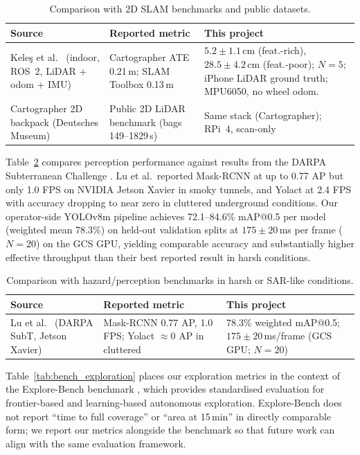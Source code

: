 \begin{table}[htbp]
\caption{Comparison with 2D SLAM benchmarks and public datasets.}
\label{tab:bench_slam}
\centering
\begin{tabular}{p{2.8cm}p{3.2cm}p{3.5cm}}
\toprule
\textbf{Source} & \textbf{Reported metric} & \textbf{This project} \\
\midrule
Kele{\c s} et al.\ \cite{keles2025} (indoor, ROS~2, LiDAR + odom + IMU) & Cartographer ATE 0.21\,m; SLAM Toolbox 0.13\,m & $5.2 \pm 1.1$\,cm (feat.-rich), $28.5 \pm 4.2$\,cm (feat.-poor); $N{=}5$; iPhone LiDAR ground truth; MPU6050, no wheel odom. \\
Cartographer 2D backpack \cite{cartographerdata} (Deutsches Museum) & Public 2D LiDAR benchmark (bags 149--1829\,s) & Same stack (Cartographer); RPi~4, scan-only \\
\bottomrule
\end{tabular}
\end{table}

Table~\ref{tab:bench_perception} compares perception performance against results from the DARPA Subterranean Challenge \cite{lu2022}. Lu et al.\ reported Mask-RCNN at up to 0.77 AP but only 1.0 FPS on NVIDIA Jetson Xavier in smoky tunnels, and Yolact at 2.4 FPS with accuracy dropping to near zero in cluttered underground conditions. Our operator-side YOLOv8m pipeline achieves 72.1--84.6\% mAP@0.5 per model (weighted mean 78.3\%) on held-out validation splits at $175 \pm 20$\,ms per frame ($N{=}20$) on the GCS GPU, yielding comparable accuracy and substantially higher effective throughput than their best reported result in harsh conditions.

\begin{table}[htbp]
\caption{Comparison with hazard/perception benchmarks in harsh or SAR-like conditions.}
\label{tab:bench_perception}
\centering
\begin{tabular}{p{2.8cm}p{3.2cm}p{3.5cm}}
\toprule
\textbf{Source} & \textbf{Reported metric} & \textbf{This project} \\
\midrule
Lu et al.\ \cite{lu2022} (DARPA SubT, Jetson Xavier) & Mask-RCNN 0.77 AP, 1.0 FPS; Yolact $\approx$0 AP in cluttered & 78.3\% weighted mAP@0.5; $175 \pm 20$\,ms/frame (GCS GPU; $N{=}20$) \\
\bottomrule
\end{tabular}
\end{table}

Table~\ref{tab:bench_exploration} places our exploration metrics in the context of the Explore-Bench benchmark \cite{xu2022}, which provides standardised evaluation for frontier-based and learning-based autonomous exploration. Explore-Bench does not report ``time to full coverage'' or ``area at 15\,min'' in directly comparable form; we report our metrics alongside the benchmark so that future work can align with the same evaluation framework.


